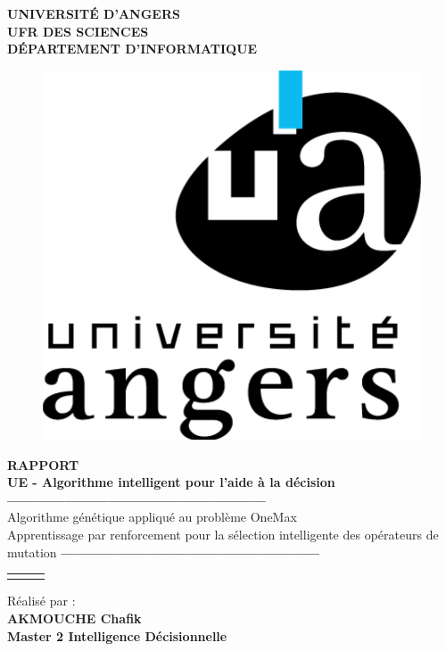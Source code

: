 \documentclass[12pt]{article}
\begin{document}
\thispagestyle{empty}
\begin{center}
\textbf{UNIVERSITÉ D'ANGERS}\\
\textbf{UFR DES SCIENCES}\\
\textbf{DÉPARTEMENT D'INFORMATIQUE}
\end{center}

\begin{figure}[H]
\begin{center}
\includegraphics[scale=0.23]{img/angers.png}
\end{center}
\end{figure}

\begin{center}
\Large{\textbf{RAPPORT}}\\
\Large{\textbf{UE - Algorithme intelligent pour l'aide à la décision}}\\


\textbf{------------------------------------------------------} \\
Algorithme génétique appliqué au problème OneMax  \\
Apprentissage par renforcement pour la sélection intelligente des opérateurs de mutation
\textbf{------------------------------------------------------} \\

\begin{table}[H]
\begin{tabular}{lll}
&&\\

\end{tabular}

\end{table}

Réalisé par :\\
\textbf{AKMOUCHE Chafik} \\

\textbf{Master 2 Intelligence Décisionnelle} \\
\end{center}
\end{document}
